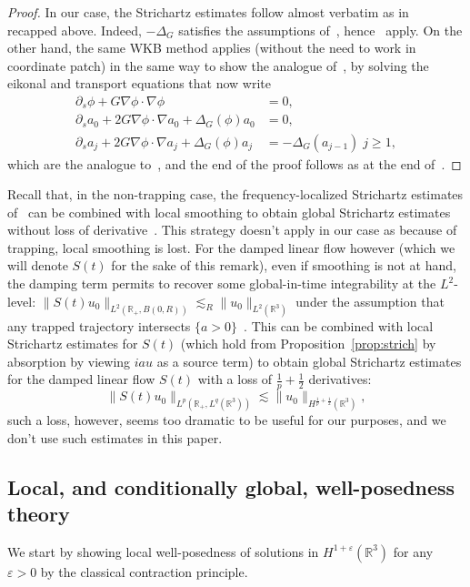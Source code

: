 \documentclass[AHL,Unicode,longabstracts,published]{cedram}
\newcommand*\R{\mathbb{R}}
\newcommand*\eps{\varepsilon}
\begin{document}
\begin{proof}
In our case, the Strichartz estimates follow almost verbatim as in~\cite[Appendix~A.1]{BuGeTz04} recapped above. Indeed, $-\Delta_G$ satisfies the assumptions of~\cite[Proposition~A.1]{BuGeTz04}, hence~\cite[Proposition~A.1, Corollary~A.2]{BuGeTz04} apply. On the other hand, the same WKB method applies (without the need to work in coordinate patch) in the same way to show the analogue of~\cite[Lemma~2.5]{BuGeTz04}, by solving the eikonal and transport equations that now write
\begin{align*}
\partial_s \phi + G\nabla \phi \cdot \nabla \phi &= 0,
\\
\partial_s a_0 + 2 G \nabla \phi \cdot \nabla a_0 + \Delta_G (\phi) a_0 &= 0,
\\
\partial_s a_j+ 2 G \nabla \phi \cdot \nabla a_j + \Delta_G (\phi) a_j &= - \Delta_G (a_{j-1})\; j\geq 1,
\end{align*}
which are the analogue to~\cite[(2.19)--(2.20)--(2.21)]{BuGeTz04}, and the end of the proof follows as at the end of~\cite[Appendix~A.1]{BuGeTz04}.
\end{proof}

\begin{rema}\label{rk:dram}
Recall that, in the non-trapping case, the frequency-localized Strichartz estimates of~\cite{BuGeTz04} can be combined with local smoothing to obtain global Strichartz estimates without loss of derivative~\cite{Iv10, StTa02}. This strategy doesn't apply in our case as because of trapping, local smoothing is lost. For the damped linear flow however (which we will denote $S(t)$ for the sake of this remark), even if smoothing is not at hand, the damping term permits to recover some global-in-time integrability at the $L^2$-level: $\| S(t) u_0 \|_{L^2(\R_+, B(0, R))} \lesssim_R \| u_0 \|_{L^2(\R^3)}$ under the assumption that any trapped trajectory intersects $\{ a > 0 \}$~\cite{AlKh07}. This can be combined with local Strichartz estimates for $S(t)$ (which hold from Proposition~\ref{prop:strich} by absorption by viewing $iau$ as a source term) to obtain global Strichartz estimates for the damped linear flow $S(t)$ with a loss of $\frac 1p + \frac 12$ derivatives:
\[
\| S(t) u_0 \|_{L^p\left(\R_+, L^q(\R^3)\right)} \lesssim \| u_0 \|_{H^{\frac 1p + \frac 12}(\R ^3)},
\]
such a loss, however, seems too dramatic to be useful for our purposes, and we don't use such estimates in this paper.
\end{rema}
\subsection{Local, and conditionally global, well-posedness theory} We start by showing local well-posedness of solutions in $H^{1+\eps}(\R^3)$ for any $\eps >0$ by the classical contraction principle.
\end{document}
